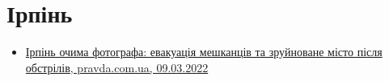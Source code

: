  
 
 
 
 
\section{Ірпінь}
\label{sec:topics.vojna.irpen}

\begin{itemize} %
\item \hyperlink{09_03_2022.stz.news.ua.pravda.1.irpen}{%
Ірпінь очима фотографа: евакуація мешканців та зруйноване місто після обстрілів, %
pravda.com.ua, 09.03.2022%
}

\end{itemize} %
